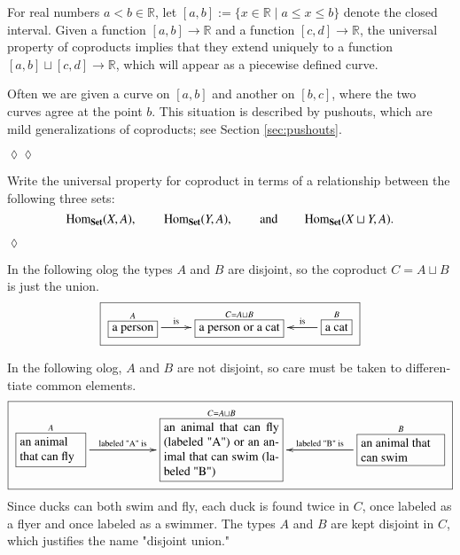 \documentclass{book}
\def\tn{\textnormal}
\def\RR{{\mathbb R}}
\def\Hom{\tn{Hom}}
\def\hsp{\hspace{.3in}}
\def\to{\rightarrow}
\def\|{{\;|\;}}
\def\rr{\raggedright}
\newcommand{\LA}[2]{\ar[#1]^-{\tn {#2}}}
\newcommand{\LAL}[2]{\ar[#1]_-{\tn {#2}}}
\newcommand{\obox}[3]{\stackrel{#1}{\fbox{\parbox{#2}{#3}}}}
\newcommand{\smbox}[2]{\stackrel{#1}{\fbox{#2}}}
\def\Set{{\bf Set}}
\theoremstyle{theoremENG}
\theoremstyle{lemmaENG}
\theoremstyle{propositionENG}
\theoremstyle{corollaryENG}
\theoremstyle{factENG}
\theoremstyle{remarkENG}
\theoremstyle{exampleENG}
\newtheorem{exampleENG}[subsubsection]{\begin{english}Example\end{english}}
\theoremstyle{warningENG}
\theoremstyle{questionENG}
\theoremstyle{guessENG}
\theoremstyle{answerENG}
\theoremstyle{constructionENG}
\theoremstyle{rulesENG}
\theoremstyle{excENG}
\newtheorem{excENG}[subsubsection]{\begin{english}Exercise\end{english}}
\theoremstyle{appENG}
\newtheorem{appENG}[subsubsection]{\begin{english}Application\end{english}}
\theoremstyle{definitionENG}
\theoremstyle{notationENG}
\theoremstyle{conjectureENG}
\theoremstyle{postulateENG}
\newenvironment{exerciseENG}{\begin{excENG}}{\hspace*{\fill}$\lozenge$\end{excENG}}
\newenvironment{applicationENG}{\begin{appENG}}{\hspace*{\fill}$\lozenge\lozenge$\end{appENG}}
\theoremstyle{theoremRUS}
\theoremstyle{lemmaRUS}
\theoremstyle{propositionRUS}
\theoremstyle{corollaryRUS}
\theoremstyle{factRUS}
\theoremstyle{remarkRUS}
\theoremstyle{exampleRUS}
\theoremstyle{warningRUS}
\theoremstyle{questionRUS}
\theoremstyle{guessRUS}
\theoremstyle{answerRUS}
\theoremstyle{constructionRUS}
\theoremstyle{rulesRUS}
\theoremstyle{excRUS}
\theoremstyle{appRUS}
\theoremstyle{definitionRUS}
\theoremstyle{notationRUS}
\theoremstyle{conjectureRUS}
\theoremstyle{postulateRUS}
\begin{document}
\begin{english}
\begin{applicationENG}[Piecewise defined curves]
\begin{russian} \end{russian}

For real numbers $a<b\in\RR$, let $[a,b]:=\{x\in\RR\|a\leq x\leq b\}$ denote the closed interval. Given a function $[a,b]\to\RR$ and a function $[c,d]\to\RR$, the universal property of coproducts implies that they extend uniquely to a function $[a,b]\sqcup[c,d]\to\RR$, which will appear as a piecewise defined curve.

\begin{russian} \end{russian}

Often we are given a curve on $[a,b]$ and another on $[b,c]$, where the two curves agree at the point $b$. This situation is described by pushouts, which are mild generalizations of coproducts; see Section \ref{sec:pushouts}.

\begin{russian} \end{russian}

\end{applicationENG}

\begin{exerciseENG}\label{exc:coprod}

Write the universal property for coproduct in terms of a relationship between the following three sets: $$\Hom_{\Set}(X,A), \hsp \Hom_\Set(Y,A), \hsp \text{and} \hsp\Hom_\Set(X\sqcup Y,A).$$ 

\begin{russian} \end{russian}

\end{exerciseENG}

\begin{exampleENG}\label{ex:coproduct1}

In the following olog the types $A$ and $B$ are disjoint, so the coproduct $C=A\sqcup B$ is just the union. $$\fbox{\xymatrix{\smbox{A}{a person}\LA{r}{is}&\smbox{C=A\sqcup B}{a person or a cat}&\smbox{B}{a cat}\LAL{l}{is}}}$$

\begin{russian} \end{russian}

\end{exampleENG}

\begin{exampleENG}\label{ex:coproduct2}

In the following olog, $A$ and $B$ are not disjoint, so care must be taken to differentiate common elements. $$\fbox{\xymatrixnocompile{\obox{A}{.7in}{\rr an animal that can fly}\LA{rr}{labeled "A" is}&&\obox{C=A\sqcup B}{1.3in}{an animal that can fly (labeled "A") or an animal that can swim (labeled "B")}&&\obox{B}{.9in}{\rr an animal that can swim}\LAL{ll}{labeled "B" is}}}$$  Since ducks can both swim and fly, each duck is found twice in $C$, once labeled as a flyer and once labeled as a swimmer.  The types $A$ and $B$ are kept disjoint in $C$, which justifies the name "disjoint union."


\end{exampleENG}
\end{english}
\end{document}
